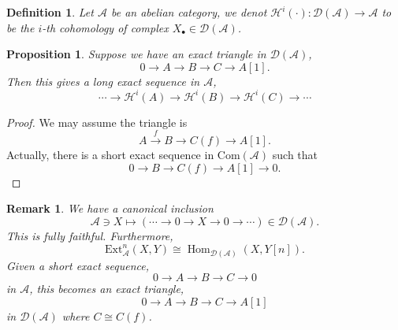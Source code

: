 \documentclass[10pt]{article}
\numberwithin{equation}{section}
\newtheorem{proposition}{Proposition}[section]
\newtheorem{definition}{Definition}[section]
\newtheorem{remark}{Remark}[section]
\DeclareMathOperator{\Hom}{Hom}
\newcommand{\cH}[0]{\mathcal{H}}
\newcommand{\cD}[0]{\mathcal{D}}
\newcommand{\sA}[0]{\mathscr{A}}
\newcommand{\Com}[0]{\mathrm{Com}}
\begin{document}

\begin{definition}
    Let $\sA$ be an abelian category, we denot $\cH^i(\cdot):\cD(\sA)\to \sA$ to be the $i$-th cohomology of complex $X_\bullet\in\cD(\sA)$.
\end{definition}

\begin{proposition}
    \label{proposition_5_1}
    Suppose we have an exact triangle in $\cD(\sA)$,
    \begin{equation*}
        0\to A\to B\to C\to A[1].
    \end{equation*}
    Then this gives a long exact sequence in $\sA$,
    \begin{equation*}
        \cdots\to\cH^i(A)\to\cH^i(B)\to\cH^i(C)\to\cdots
    \end{equation*}
\end{proposition}
\begin{proof}
    We may assume the triangle is 
    \begin{equation*}
        A\stackrel{f}{\to}B\to C(f)\to A[1].
    \end{equation*}
    Actually, there is a short exact sequence in $\Com(\sA)$ such that 
    \begin{equation*}
        0\to B\to C(f)\to A[1]\to 0.
    \end{equation*}
\end{proof}

\begin{remark}
    We have a canonical inclusion 
    \begin{equation*}
        \sA\ni X\mapsto (\cdots\to 0\to X\to 0\to\cdots)\in\cD(\sA).
    \end{equation*}
    This is fully faithful. Furthermore,
    \begin{equation*}
        \mathrm{Ext}_\sA^n(X,Y)\cong \Hom_{\cD(\sA)}(X,Y[n]).
    \end{equation*}
    Given a short exact sequence,
    \begin{equation*}
        0\to A\to B\to C\to 0
    \end{equation*}
    in $\sA$, this becomes an exact triangle,
    \begin{equation*}
        0\to A\to B\to C\to A[1]
    \end{equation*}
    in $\cD(\sA)$ where $C\cong C(f)$.
\end{remark}
\end{document}
